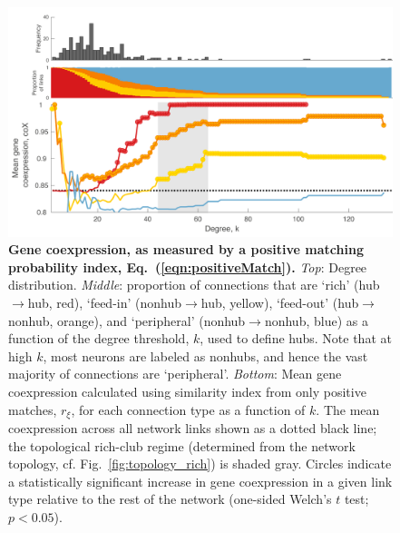 \documentclass[10pt,letterpaper]{article}
\begin{document}
\begin{figure}[!h]
\label{RFPposmatches}
\centering
    \includegraphics[width=1\textwidth]{meanCoexpressionCoXALL.pdf}
\caption{
\textbf{Gene coexpression, as measured by a positive matching probability index, Eq.~(\ref{eqn:positiveMatch}).}
\emph{Top}: Degree distribution.
\emph{Middle}: proportion of connections that are `rich' (hub$\rightarrow$hub, red), `feed-in' (nonhub$\rightarrow$hub, yellow), `feed-out' (hub$\rightarrow$nonhub, orange), and `peripheral' (nonhub$\rightarrow$nonhub, blue) as a function of the degree threshold, $k$, used to define hubs.
Note that at high $k$, most neurons are labeled as nonhubs, and hence the vast majority of connections are `peripheral'.
\emph{Bottom}: Mean gene coexpression calculated using similarity index from only positive matches, $r_\xi$, for each connection type as a function of $k$.
The mean coexpression across all network links shown as a dotted black line; the topological rich-club regime (determined from the network topology, cf. Fig.~\ref{fig:topology_rich}) is shaded gray.
Circles indicate a statistically significant increase in gene coexpression in a given link type relative to the rest of the network (one-sided Welch's $t$ test; $p < 0.05$).
}
\end{figure}
\end{document}
